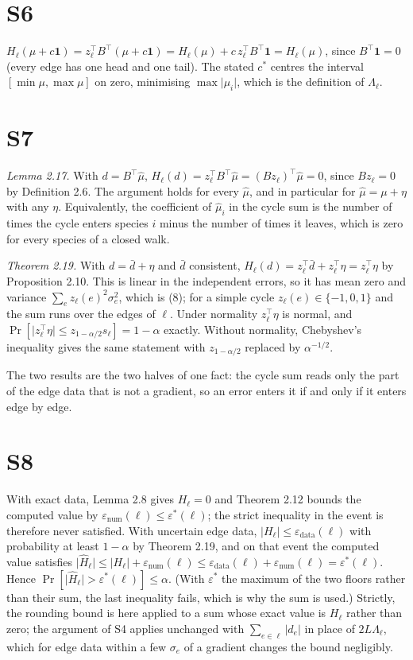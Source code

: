 \documentclass[11pt,a4paper]{article}
\theoremstyle{definition}
\theoremstyle{remark}
\newcommand{\abs}[1]{\lvert#1\rvert}
\newcommand{\eps}{\varepsilon}
\newcommand{\epsnum}{\eps_{\mathrm{num}}}
\newcommand{\epsdata}{\eps_{\mathrm{data}}}
\newcommand{\epsstar}{\eps^{\ast}}
\newcommand{\hol}{H}
\begin{document}
\section*{S6}
$\hol_\ell(\mu+c\mathbf{1}) = z_\ell^{\top}B^{\top}(\mu+c\mathbf{1})
= \hol_\ell(\mu) + c\,z_\ell^{\top}B^{\top}\mathbf{1} = \hol_\ell(\mu)$,
since $B^{\top}\mathbf{1}=0$ (every edge has one head and one tail).
The stated $c^{\ast}$ centres the interval $[\min\mu,\max\mu]$ on zero,
minimising $\max\abs{\mu_i}$, which is the definition of $\Lambda_\ell$.

\section*{S7}
\emph{Lemma 2.17.} With $d=B^{\top}\hat\mu$,
$\hol_\ell(d)=z_\ell^{\top}B^{\top}\hat\mu=(Bz_\ell)^{\top}\hat\mu=0$,
since $Bz_\ell=0$ by Definition 2.6. The argument holds for every
$\hat\mu$, and in particular for $\hat\mu=\mu+\eta$ with any $\eta$.
Equivalently, the coefficient of $\hat\mu_i$ in the cycle sum is the
number of times the cycle enters species $i$ minus the number of times
it leaves, which is zero for every species of a closed walk.

\emph{Theorem 2.19.} With $d=\bar d+\eta$ and $\bar d$
consistent, $\hol_\ell(d)=z_\ell^{\top}\bar d+z_\ell^{\top}\eta
=z_\ell^{\top}\eta$ by Proposition 2.10. This is linear in the
independent errors, so it has mean zero and variance
$\sum_e z_\ell(e)^{2}\sigma_e^{2}$, which is (8); for a
simple cycle $z_\ell(e)\in\{-1,0,1\}$ and the sum runs over the edges of
$\ell$. Under normality $z_\ell^{\top}\eta$ is normal, and
$\Pr[\abs{z_\ell^{\top}\eta}\le z_{1-\alpha/2}s_\ell]=1-\alpha$ exactly.
Without normality, Chebyshev's inequality gives the same statement with
$z_{1-\alpha/2}$ replaced by $\alpha^{-1/2}$.

The two results are the two halves of one fact: the cycle sum reads only
the part of the edge data that is not a gradient, so an error enters it
if and only if it enters edge by edge.

\section*{S8}
With exact data, Lemma 2.8 gives $\hol_\ell = 0$ and
Theorem 2.12 bounds the computed value by $\epsnum(\ell) \le
\epsstar(\ell)$; the strict inequality in the event is therefore never
satisfied. With uncertain edge data, $\abs{\hol_\ell} \le \epsdata(\ell)$
with probability at least $1-\alpha$ by Theorem 2.19, and on
that event the computed value satisfies
$\abs{\widehat{\hol}_\ell}\le\abs{\hol_\ell}+\epsnum(\ell)
\le\epsdata(\ell)+\epsnum(\ell)=\epsstar(\ell)$. Hence
$\Pr[\abs{\widehat{\hol}_\ell}>\epsstar(\ell)]\le\alpha$. (With
$\epsstar$ the maximum of the two floors rather than their sum, the last
inequality fails, which is why the sum is used.) Strictly, the rounding
bound is here applied to a sum whose exact value is $\hol_\ell$ rather
than zero; the argument of S4 applies unchanged with
$\sum_{e\in\ell}\abs{d_e}$ in place of $2L\Lambda_\ell$, which for edge
data within a few $\sigma_e$ of a gradient changes the bound
negligibly.
\end{document}
